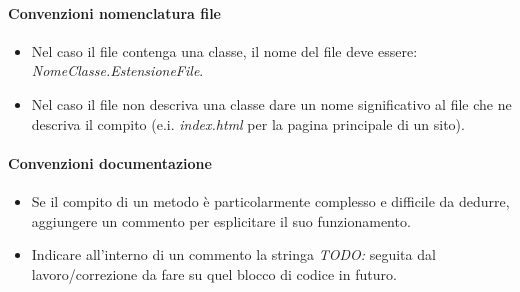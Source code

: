 \documentclass[a4paper, 12pt]{article}
\begin{document}
\paragraph{Convenzioni nomenclatura file}
	\begin{itemize}
		\item Nel caso il file contenga una classe, il nome del file deve essere: \textit{NomeClasse.EstensioneFile}.
		\item Nel caso il file non descriva una classe dare un nome significativo al file che ne descriva il compito
		(e.i. \textit{index.html} per la pagina principale di un sito). 
	\end{itemize}
\paragraph{Convenzioni documentazione}
	\begin{itemize}
		\item Se il compito di un metodo è particolarmente complesso e difficile da dedurre, aggiungere un commento
		per esplicitare il suo funzionamento.
		\item Indicare all'interno di un commento la stringa \textit{TODO:} seguita dal lavoro/correzione da fare su quel 
		blocco di codice in futuro.
	\end{itemize}
\end{document}

